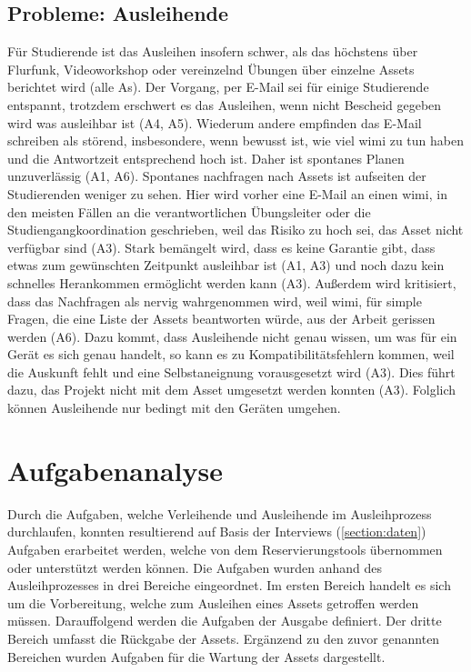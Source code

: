 \subsection{Probleme: Ausleihende}
Für Studierende ist das Ausleihen insofern schwer, als das höchstens über Flurfunk, Videoworkshop
oder vereinzelnd Übungen über einzelne Assets berichtet wird (alle As). Der Vorgang, per E-Mail sei
für einige Studierende entspannt, trotzdem erschwert es das Ausleihen, wenn nicht Bescheid gegeben
wird was ausleihbar ist (A4, A5). Wiederum andere empfinden das E-Mail schreiben als störend,
insbesondere, wenn bewusst ist, wie viel \ac{wimi} zu tun haben und die Antwortzeit entsprechend
hoch ist. Daher ist spontanes Planen unzuverlässig (A1, A6). Spontanes nachfragen nach Assets ist
aufseiten der Studierenden weniger zu sehen. Hier wird vorher eine E-Mail an einen \ac{wimi}, in den
meisten Fällen an die verantwortlichen Übungsleiter oder die Studiengangkoordination geschrieben,
weil das Risiko zu hoch sei, das Asset nicht verfügbar sind (A3). Stark bemängelt wird, dass
es keine Garantie gibt, dass etwas zum gewünschten Zeitpunkt ausleihbar ist (A1, A3) und noch dazu
kein schnelles Herankommen ermöglicht werden kann (A3). Außerdem wird kritisiert, dass das
Nachfragen als nervig wahrgenommen wird, weil \ac{wimi}, für simple Fragen, die eine Liste der
Assets beantworten würde, aus der Arbeit gerissen werden (A6). Dazu kommt, dass Ausleihende nicht
genau wissen, um was für ein Gerät es sich genau handelt, so kann es zu Kompatibilitätsfehlern
kommen, weil die Auskunft fehlt und eine Selbstaneignung vorausgesetzt wird (A3). Dies führt dazu,
das Projekt nicht mit dem Asset umgesetzt werden konnten (A3). Folglich können Ausleihende nur
bedingt mit den Geräten umgehen.


\section{Aufgabenanalyse}
\label{section:aufgaben}
Durch die Aufgaben, welche Verleihende und Ausleihende im Ausleihprozess durchlaufen, konnten
resultierend auf Basis der Interviews (\ref{section:daten}) Aufgaben erarbeitet werden, welche von
dem Reservierungstools übernommen oder unterstützt werden können. Die Aufgaben wurden anhand des
Ausleihprozesses in drei Bereiche eingeordnet. Im ersten Bereich handelt es sich um die
Vorbereitung, welche zum Ausleihen eines Assets getroffen werden müssen. Darauffolgend werden die
Aufgaben der Ausgabe definiert. Der dritte Bereich umfasst die Rückgabe der Assets. Ergänzend zu den
zuvor genannten Bereichen wurden Aufgaben für die Wartung der Assets dargestellt.

